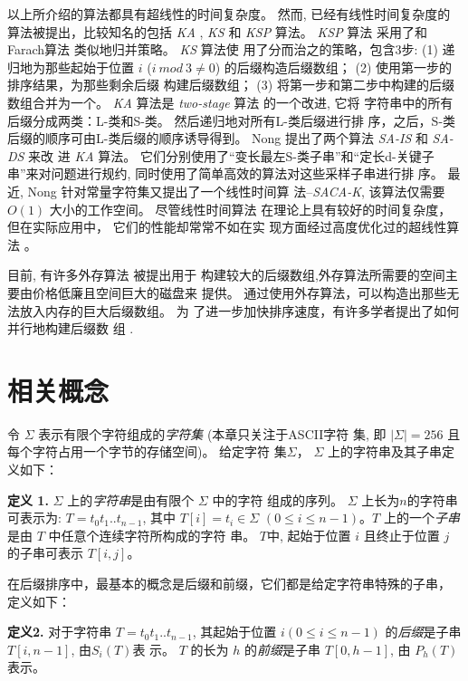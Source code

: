 以上所介绍的算法都具有超线性的时间复杂度。 然而, 已经有线性时间复杂度的
算法被提出，比较知名的包括 \emph{KA} \cite{Ko2005}, \emph{KS}
\cite{Karkkainen2006} 和 \emph{KSP}\cite{Kim2005} 算法。 \emph{KSP} 算法
采用了和Farach算法 \cite{Farach1997} 类似地归并策略。 \emph{KS} 算法使
用了分而治之的策略，包含3步: (1) 递归地为那些起始于位置 $i$ ($i~mod~3
\neq 0$) 的后缀构造后缀数组； (2) 使用第一步的排序结果，为那些剩余后缀
构建后缀数组； (3) 将第一步和第二步中构建的后缀数组合并为一个。
\emph{KA} 算法是 \emph{two-stage} 算法\cite{Itoh1999} 的一个改进, 它将
字符串中的所有后缀分成两类：L-类和S-类。 然后递归地对所有L-类后缀进行排
序，之后，S-类后缀的顺序可由L-类后缀的顺序诱导得到。 Nong
\cite{Nong2011}提出了两个算法 \emph{SA-IS} 和 \emph{SA-DS} 来改
进 \emph{KA} 算法。 它们分别使用了“变长最左S-类子串”和“定长d-关键子
串”来对问题进行规约, 同时使用了简单高效的算法对这些采样子串进行排
序。 最近, Nong\cite{Nong2013} 针对常量字符集又提出了一个线性时间算
法--\emph{SACA-K}, 该算法仅需要 $O(1)$ 大小的工作空间。 尽管线性时间算法
在理论上具有较好的时间复杂度，但在实际应用中， 它们的性能却常常不如在实
现方面经过高度优化过的超线性算法 \cite{Rajasekaran2014}。

目前, 有许多外存算法\cite{Karkkainen2014,Nong2014,Nong2015} 被提出用于
构建较大的后缀数组,外存算法所需要的空间主要由价格低廉且空间巨大的磁盘来
提供。 通过使用外存算法，可以构造出那些无法放入内存的巨大后缀数组。 为
了进一步加快排序速度，有许多学者提出了如何并行地构建后缀数
组 \cite{Schmidt2016,Metwally2016,Flick2015,Deo2013}.

\section{相关概念}
\label{sec:stucture}

令 $\Sigma$ 表示有限个字符组成的\emph{字符集} (本章只关注于ASCII字符
集, 即 $|\Sigma| = 256$ 且每个字符占用一个字节的存储空间)。 给定字符
集$\Sigma$， $\Sigma$ 上的字符串及其子串定义如下：

\textbf{定义 1.} $\Sigma$ 上的\emph{字符串}是由有限个 $\Sigma$ 中的字符
组成的序列。 $\Sigma$ 上长为$n$的字符串可表示为: $T =
t_0t_1..t_{n-1}$, 其中 $T[i] = t_i \in \Sigma$ $(0 \leq i \leq
n-1)$。$T$ 上的一个\emph{子串}是由 $T$ 中任意个连续字符所构成的字符
串。 $T$中, 起始于位置 $i$ 且终止于位置 $j$ 的子串可表示 $T[i,j]$。

在后缀排序中，最基本的概念是后缀和前缀，它们都是给定字符串特殊的子串，
定义如下：

\textbf{定义2.} 对于字符串 $T = t_0t_1..t_{n-1}$, 其起始于位置
$i(0 \leq i \leq n-1)$ 的\emph{后缀}是子串 $T[i,n-1]$, 由$S_i(T)$表
示。  $T$ 的长为 $h$ 的\emph{前缀}是子串 $T[0,h-1]$, 由 $P_h(T)$ 表示。

